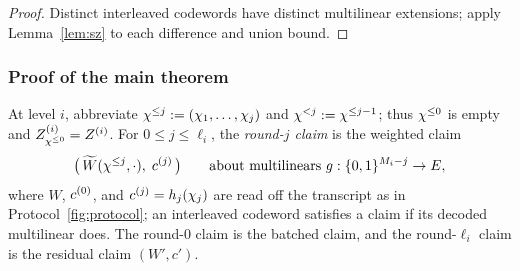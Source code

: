 \begin{proof}
Distinct interleaved codewords have distinct multilinear extensions; apply Lemma~\ref{lem:sz} to each difference and union bound.
\end{proof}

\subsubsection{Proof of the main theorem}\label{pcs:proof}

At level $i$, abbreviate $\chi^{\le j} := (\chi_1, \dots, \chi_j)$ and $\chi^{<j} := \chi^{\le j-1}$; thus $\chi^{\le 0}$ is empty and $Z^{(i)}_{\chi^{\le 0}} = Z^{(i)}$. For $0 \le j \le \ell_i$, the \emph{round-$j$ claim} is the weighted claim
\[
\bigl(\, \widetilde{W}(\chi^{\le j}, \cdot),\; c^{(j)} \,\bigr) \qquad \text{about multilinears } g : \{0,1\}^{M_i - j} \to E,
\]
where $W$, $c^{(0)}$, and $c^{(j)} = h_j(\chi_j)$ are read off the transcript as in Protocol~\ref{fig:protocol}; an interleaved codeword satisfies a claim if its decoded multilinear does. The round-$0$ claim is the batched claim, and the round-$\ell_i$ claim is the residual claim $(W', c')$.

